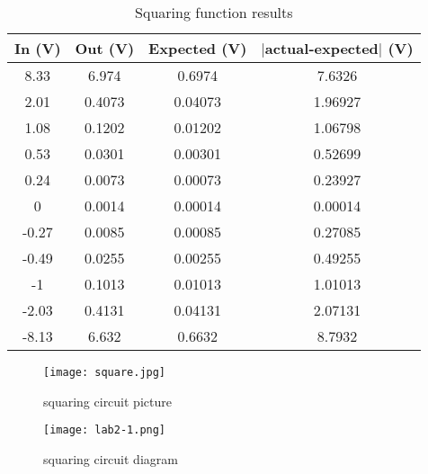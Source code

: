 \documentclass[prl,12pt,notitlepage,aps,onecolumn,superscriptaddress]{revtex4-1}
\begin{document}
\begin{table}[h]
 \centering
 \caption{Squaring function results}
   \begin{tabular}{|c|c|c|c|}
   \toprule
 In (V)   & Out (V)  & Expected (V)  & $|$actual-expected$|$ (V) \\
   \midrule
   8.33  & 6.974 & 0.6974 & 7.6326 \\
   2.01  & 0.4073 & 0.04073 & 1.96927 \\
   1.08  & 0.1202 & 0.01202 & 1.06798 \\
   0.53  & 0.0301 & 0.00301 & 0.52699 \\
   0.24  & 0.0073 & 0.00073 & 0.23927 \\
   0     & 0.0014 & 0.00014 & 0.00014 \\
   -0.27 & 0.0085 & 0.00085 & 0.27085 \\
   -0.49 & 0.0255 & 0.00255 & 0.49255 \\
   -1    & 0.1013 & 0.01013 & 1.01013 \\
   -2.03 & 0.4131 & 0.04131 & 2.07131 \\
   -8.13 & 6.632 & 0.6632 & 8.7932 \\
   \bottomrule
   \end{tabular}%
 \label{tab:addlabel}%
\end{table}%

\begin{figure}[h]
\begin{center}
\texttt{[image: square.jpg]}
\end{center}
\caption{\label{fig:pic} squaring circuit picture}
\end{figure}

\begin{figure}[h]
\begin{center}
\texttt{[image: lab2-1.png]}
\end{center}
\caption{\label{fig:pic} squaring circuit diagram}
\end{figure}
\end{document}
